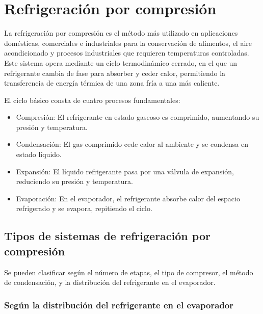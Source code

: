 \chapter{Refrigeración por compresión}
\minitoc

	La refrigeración por compresión es el método más utilizado en aplicaciones domésticas, comerciales e industriales para la conservación de alimentos, el aire acondicionado y procesos industriales que requieren temperaturas controladas. Este sistema opera mediante un ciclo termodinámico cerrado, en el que un refrigerante cambia de fase para absorber y ceder calor, permitiendo la transferencia de energía térmica de una zona fría a una más caliente.
	
	El ciclo básico consta de cuatro procesos fundamentales:
	
	\begin{itemize}
		\item Compresión: El refrigerante en estado gaseoso es comprimido, aumentando su presión y temperatura.
		
		\item Condensación: El gas comprimido cede calor al ambiente y se condensa en estado líquido.

		\item Expansión: El líquido refrigerante pasa por una válvula de expansión, reduciendo su presión y temperatura.
		
		\item Evaporación: En el evaporador, el refrigerante absorbe calor del espacio refrigerado y se evapora, repitiendo el ciclo.
	\end{itemize}


	\section{Tipos de sistemas de refrigeración por compresión}
	
	Se pueden clasificar según el número de etapas, el tipo de compresor, el método de condensación, y la distribución del refrigerante en el evaporador.
	
	\subsection{Según la distribución del refrigerante en el evaporador}
	

